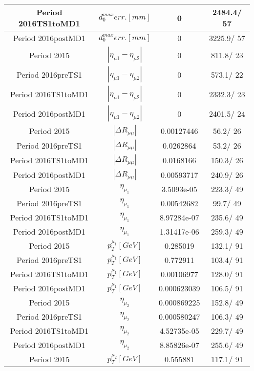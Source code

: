 \documentclass{article}
\begin{document}
\begin{longtable}{c|c|c|c}
\hline
 Period 2016TS1toMD1 & $d_{0}^{max} err. [mm]$ & 0 & 2484.4/ 57\\
\hline
 Period 2016postMD1 & $d_{0}^{max} err. [mm]$ & 0 & 3225.9/ 57\\
\hline
 Period 2015 & $|\eta_{\mu1}-\eta_{\mu2}|$ & 0 & 811.8/ 23\\
\hline
 Period 2016preTS1 & $|\eta_{\mu1}-\eta_{\mu2}|$ & 0 & 573.1/ 22\\
\hline
 Period 2016TS1toMD1 & $|\eta_{\mu1}-\eta_{\mu2}|$ & 0 & 2332.3/ 23\\
\hline
 Period 2016postMD1 & $|\eta_{\mu1}-\eta_{\mu2}|$ & 0 & 2401.5/ 24\\
\hline
 Period 2015 & $|\Delta R_{\mu \mu}|$ & 0.00127446 &  56.2/ 26\\
\hline
 Period 2016preTS1 & $|\Delta R_{\mu \mu}|$ & 0.0262864 &  53.2/ 26\\
\hline
 Period 2016TS1toMD1 & $|\Delta R_{\mu \mu}|$ & 0.0168166 & 150.3/ 26\\
\hline
 Period 2016postMD1 & $|\Delta R_{\mu \mu}|$ & 0.00593717 & 240.9/ 26\\
\hline
 Period 2015 & $\eta_{\mu_{1}}$ & 3.5093e-05 & 223.3/ 49\\
\hline
 Period 2016preTS1 & $\eta_{\mu_{1}}$ & 0.00542682 &  99.7/ 49\\
\hline
 Period 2016TS1toMD1 & $\eta_{\mu_{1}}$ & 8.97284e-07 & 235.6/ 49\\
\hline
 Period 2016postMD1 & $\eta_{\mu_{1}}$ & 1.31417e-06 & 259.3/ 49\\
\hline
 Period 2015 & $p_{T}^{\mu_{1}} [GeV]$ & 0.285019 & 132.1/ 91\\
\hline
 Period 2016preTS1 & $p_{T}^{\mu_{1}} [GeV]$ & 0.772911 & 103.4/ 91\\
\hline
 Period 2016TS1toMD1 & $p_{T}^{\mu_{1}} [GeV]$ & 0.00106977 & 128.0/ 91\\
\hline
 Period 2016postMD1 & $p_{T}^{\mu_{1}} [GeV]$ & 0.000623039 & 106.5/ 91\\
\hline
 Period 2015 & $\eta_{\mu_{2}}$ & 0.000869225 & 152.8/ 49\\
\hline
 Period 2016preTS1 & $\eta_{\mu_{2}}$ & 0.000580247 & 106.3/ 49\\
\hline
 Period 2016TS1toMD1 & $\eta_{\mu_{2}}$ & 4.52735e-05 & 229.7/ 49\\
\hline
 Period 2016postMD1 & $\eta_{\mu_{2}}$ & 8.85826e-07 & 255.6/ 49\\
\hline
 Period 2015 & $p_{T}^{\mu_{2}} [GeV]$ & 0.555881 & 117.1/ 91\\

\end{longtable}
\end{document}
